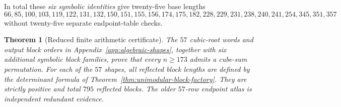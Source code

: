 \documentclass[10pt]{article}
\newtheorem{theorem}{Theorem}
\begin{document}
In total these \emph{six symbolic identities}
give twenty-five base lengths
\[
66,85,100,103,119,122,131,132,150,151,155,156,174,175,182,228,229,231,238,240,241,254,345,351,357
\]
without twenty-five separate endpoint-table checks.

\begin{theorem}[Reduced finite arithmetic certificate]
\label{thm:finite-interval-atlas}
The $57$ cubic-root words and output
block orders in Appendix~\ref{app:algebraic-shapes},
together with six additional symbolic block
families, prove that every $n\ge173$ admits
a cube-sum permutation.
For each of the $57$ shapes, all reflected
block lengths are defined by the determinant
formula of Theorem~\ref{thm:unimodular-block-factory}.
They are strictly positive and total $795$
reflected blocks. The older $57$-row endpoint
atlas is independent redundant evidence.
\end{theorem}
\end{document}
